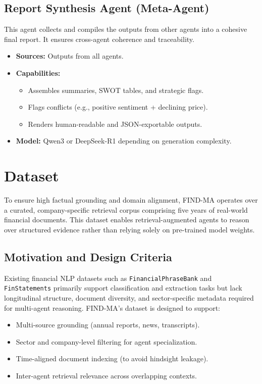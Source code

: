 \documentclass[11pt]{article}
\newcommand{\findma}{\textsc{FIND-MA}}
\begin{document}
\subsection*{Report Synthesis Agent (Meta-Agent)}
This agent collects and compiles the outputs from other agents into a cohesive final report. It ensures cross-agent coherence and traceability.
\begin{itemize}
    \item \textbf{Sources:} Outputs from all agents.
    \item \textbf{Capabilities:}
        \begin{itemize}
            \item Assembles summaries, SWOT tables, and strategic flags.
            \item Flags conflicts (e.g., positive sentiment + declining price).
            \item Renders human-readable and JSON-exportable outputs.
        \end{itemize}
    \item \textbf{Model:} Qwen3 or DeepSeek-R1 depending on generation complexity.
\end{itemize}

\section{Dataset}
\label{sec:dataset}
To ensure high factual grounding and domain alignment, \findma{} operates over a curated, company-specific retrieval corpus comprising five years of real-world financial documents. This dataset enables retrieval-augmented agents to reason over structured evidence rather than relying solely on pre-trained model weights.

\subsection*{Motivation and Design Criteria}
Existing financial NLP datasets such as \texttt{FinancialPhraseBank} and \texttt{FinStatements} primarily support classification and extraction tasks but lack longitudinal structure, document diversity, and sector-specific metadata required for multi-agent reasoning. \findma{}’s dataset is designed to support:
\begin{itemize}
    \item Multi-source grounding (annual reports, news, transcripts).
    \item Sector and company-level filtering for agent specialization.
    \item Time-aligned document indexing (to avoid hindsight leakage).
    \item Inter-agent retrieval relevance across overlapping contexts.
\end{itemize}
\end{document}

